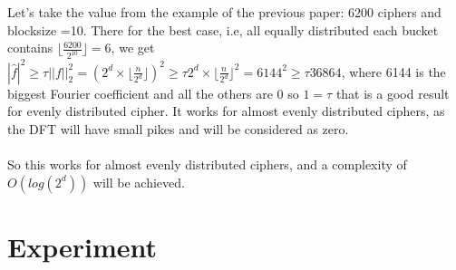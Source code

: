 \documentclass{article}
\begin{document}
Let's take the value from the example of the previous paper: 6200 ciphers and blocksize =10. There for the best case, i.e, all equally distributed each bucket contains ${\lfloor \frac{6200}{2^{10}} \rfloor} = 6$, we get $|\hat{f}|^2 \geq \tau||f||^{2}_2 =  (2^d \times {\lfloor \frac{n}{2^d} \rfloor})^2 \geq \tau 2^d \times {\lfloor \frac{n}{2^d} \rfloor}^{2} = 6144^2 \geq \tau 36864$, where 6144 is the biggest Fourier coefficient and all the others are 0 so $ 1 = \tau$ that is a good result for evenly distributed cipher. It works for almost evenly distributed ciphers, as the DFT will have small pikes and will be considered as zero.\\
\\
So this works for almost evenly distributed ciphers,  and a complexity of $O(log(2^d))$ will be achieved.


\section*{Experiment}
\end{document}
